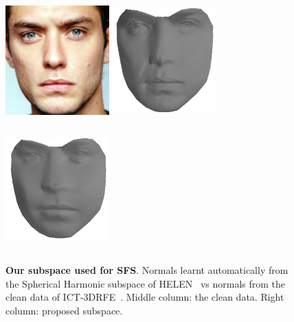 \begin{figure}[t]
    \includegraphics[width=4cm,height=4.8cm]{collection_ps/images/smith/jude_law}                          \hspace{0.3cm}
    \includegraphics[width=4cm,height=4.8cm]{collection_ps/images/smith/law_smith_frontal_ict}             \hspace{0.3cm}
    \includegraphics[width=4cm,height=4.8cm]{collection_ps/images/smith/law_smith_frontal_low_rank}
    \caption{{\bf Our subspace used for SFS}. Normals learnt automatically from 
             the Spherical Harmonic subspace of HELEN~\cite{le2012interactive} vs
             normals from the clean data of ICT-3DRFE~\cite{stratou2012exploring}.
             Middle column: the clean data. 
             Right column: proposed subspace.}
\label{fig:imag_coll_smith}
\end{figure}
